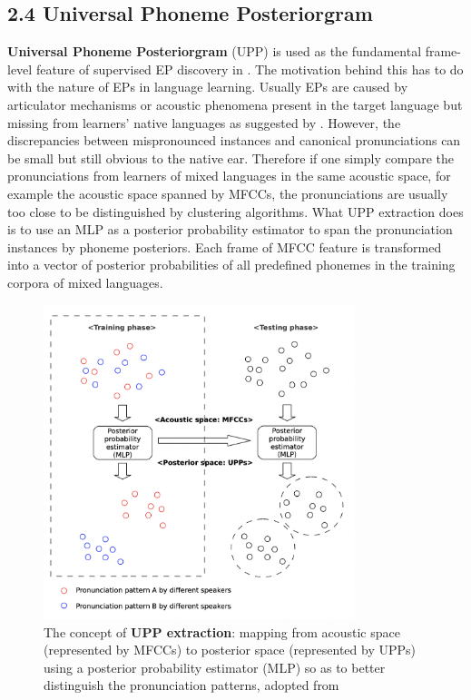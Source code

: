 \documentclass[nobib]{tufte-handout}
\begin{document}
\subsection{2.4 \textbf{Universal Phoneme Posteriorgram}}
\noindent \textbf{Universal Phoneme Posteriorgram} (UPP) is used as the fundamental frame-level feature of supervised EP discovery in \cite{wang2015supervised}. The motivation behind this has to do with the nature of EPs in language learning. Usually EPs are caused by articulator mechanisms or acoustic phenomena present in the target language but missing from learners' native languages as suggested by \cite{wang2015supervised}. However, the discrepancies between mispronounced instances and canonical pronunciations can be small but still obvious to the native ear. Therefore if one simply compare the pronunciations from learners of mixed languages in the same acoustic space, for example the acoustic space spanned by MFCCs, the pronunciations are usually too close to be distinguished by clustering algorithms. What UPP extraction does is to use an MLP as a posterior probability estimator to span the pronunciation instances by phoneme posteriors. Each frame of MFCC feature is transformed into a vector of posterior probabilities of all predefined phonemes in the training corpora of mixed languages.
\begin{figure}[h!]
\centering
  \includegraphics[width=0.81\textwidth]{upp.png}
  \caption{The concept of \textbf{UPP extraction}: mapping from acoustic space (represented by MFCCs) to posterior space (represented by UPPs) using a posterior probability estimator (MLP) so as to better distinguish the pronunciation patterns, adopted from \cite{wang2015supervised}}
  \label{fig:upp}
\end{figure}
\end{document}
